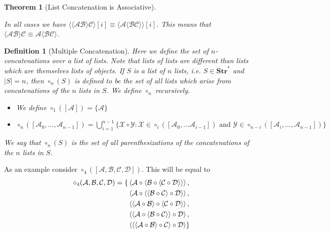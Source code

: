 \documentclass[12pt]{article}
\theoremstyle{break}
\newtheorem{definition}{Definition}[section]
\theoremstyle{break}
\newtheorem{theorem}{Theorem}[section]
\theoremstyle{break}
\theoremstyle{break}
\newcommand{\mc}[1]{\mathcal{#1}}
\begin{document}
\begin{theorem}[List Concatenation is Associative]
\begin{itemize}
In all cases we have $\langle\langle\mc{A}\mc{B}\rangle\mc{C}\rangle[i] \equiv \langle\mc{A}\langle\mc{B}\mc{C}\rangle\rangle[i]$.
This means that $\langle\mc{A}\mc{B}\rangle\mc{C} \equiv \mc{A}\langle\mc{B}\mc{C}\rangle$. 
\end{itemize}
\end{theorem}

\begin{definition}[Multiple Concatenation]
Here we define the set of $n$-concatenations over a list of lists. 
Note that lists of lists are different than lists which are themselves lists of objects.
If $S$ is a list of $n$ lists, i.e. $S\in \textbf{Str}^*$ and $|S| = n$, then $\circ_n(S)$ is defined to be the set of all lists which arise from concatenations of the $n$ lists in $S$.
We define $\circ_n$ recursively.

\begin{itemize}
\item{We define $\circ_1([\mc{A}]) = \{\mc{A}\}$}
\item{$\circ_n([\mc{A}_0,\ldots, \mc{A}_{n-1}]) = \bigcup_{i=1}^{n-1} \{\mc{X}\circ\mc{Y}:\mc{X} \in \circ_i([\mc{A}_0,\ldots \mc{A}_{i-1}]) \text{ and } \mc{Y}\in \circ_{n-i}([\mc{A}_{i}, \ldots, \mc{A}_{n-1}])\}$}
\end{itemize}
We say that $\circ_n(S)$ is the set of all parenthesizations of the concatenations of the $n$ lists in $S$.

\end{definition}

As an example consider $\circ_4([\mc{A}, \mc{B}, \mc{C}, \mc{D}])$. This will be equal to
\begin{align*}
\circ_4(\mc{A}, \mc{B}, \mc{C}, \mc{D}) = \{&\Braket{\mc{A}\circ\Braket{\mc{B}\circ\Braket{\mc{C}\circ\mc{D}}}},\\
&\Braket{\mc{A}\circ\Braket{\Braket{\mc{B}\circ\mc{C}}\circ\mc{D}}},\\
&\Braket{\Braket{\mc{A}\circ\mc{B}}\circ\Braket{\mc{C}\circ\mc{D}}},\\
&\Braket{\Braket{\mc{A}\circ\Braket{\mc{B}\circ\mc{C}}}\circ\mc{D}},\\
&\Braket{\Braket{\Braket{\mc{A}\circ\mc{B}}\circ\mc{C}}\circ\mc{D}}\}
\end{align*}
\end{document}
